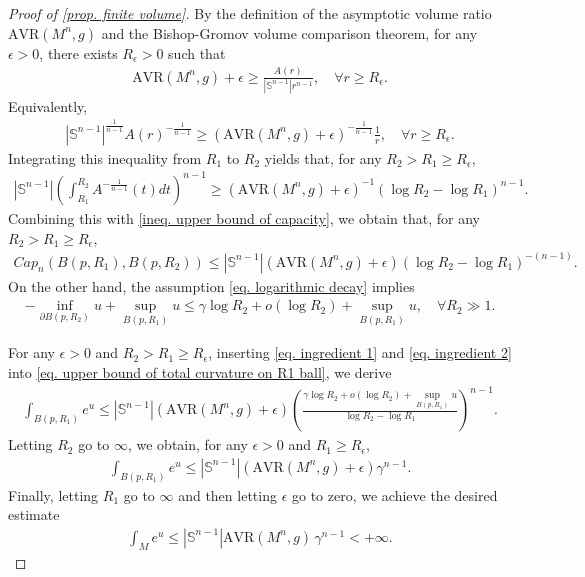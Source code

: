 \documentclass[12pt]{amsart}
\theoremstyle{plain}
\theoremstyle{definition}
\theoremstyle{remark}     %
\begin{document}
\begin{proof}[Proof of \cref{prop. finite volume}]
    By the definition of the asymptotic volume ratio $\mathrm{AVR}(M^n,g)$ and the Bishop-Gromov volume comparison theorem, for any $\epsilon>0$, there exists $R_\epsilon>0$ such that
    \begin{align*}
        \mathrm{AVR}(M^n,g)+\epsilon\geq \frac{A(r)}{|\mathbb{S}^{n-1}|r^{n-1}},\quad \forall r\geq R_\epsilon.
    \end{align*}
    Equivalently,
    \begin{align*}
        |\mathbb{S}^{n-1}|^{\frac{1}{n-1}} 
        A(r)^{-\frac{1}{n-1}}
        \geq (\mathrm{AVR}(M^n,g)+\epsilon)^{-\frac{1}{n-1}}\frac{1}{r},\quad \forall r\geq R_\epsilon.
    \end{align*}
    Integrating this inequality from $R_1$ to $R_2$ yields that, for any $R_2>R_1\geq R_\epsilon$,
    \begin{align*}
        |\mathbb{S}^{n-1}|
        \left(\int_{R_1}^{R_2} A^{-\frac{1}{n-1}}(t)d t\right)^{n-1}
        \geq (\mathrm{AVR}(M^n,g)+\epsilon)^{-1}
        (\log R_2-\log R_1)^{n-1}.
    \end{align*}
    Combining this with \cref{ineq. upper bound of capacity}, we obtain that, for any $R_2>R_1\geq R_\epsilon$,
    \begin{align}\label{eq. ingredient 1}
        Cap_n(B(p,R_1), B(p,R_2))
        \leq 
        |\mathbb{S}^{n-1}|(\mathrm{AVR}(M^n,g)+\epsilon)
        \left(\log R_2-\log R_1\right)^{-(n-1)}.
    \end{align}
    On the other hand, the assumption \cref{eq. logarithmic decay} implies
    \begin{align}\label{eq. ingredient 2}
        -\inf_{\partial B(p,R_2)} u
        +\sup_{ B(p,R_1)}u
        \leq \gamma\log R_2+o(\log R_2)
        +\sup_{ B(p,R_1)}u,\quad 
        \forall R_2\gg 1.
    \end{align}
    
    For any $\epsilon>0$ and $R_2> R_1\geq R_\epsilon$,  inserting \cref{eq. ingredient 1} and \cref{eq. ingredient 2} into \cref{eq. upper bound of total curvature on R1 ball}, we derive
    \begin{align*}
        \int_{B(p,R_1)}e^u
        \leq |\mathbb{S}^{n-1}|
        (\mathrm{AVR}(M^n,g)+\epsilon)
        \left(\frac{\gamma\log R_2+o(\log R_2)+\sup_{B(p,R_1)}u}{\log R_2-\log R_1}\right)^{n-1}.
    \end{align*}
    Letting $R_2$ go to $\infty$, we obtain, for any $\epsilon>0$ and $R_1\geq R_\epsilon$,
    \begin{align*}
    \int_{B(p,R_1)}e^u
    \leq |\mathbb{S}^{n-1}|(\mathrm{AVR}(M^n,g)+\epsilon)
    \gamma^{n-1}.
    \end{align*}
    Finally, letting $R_1$ go to $\infty$ and then letting $\epsilon$ go to zero, we achieve the desired estimate
    \begin{align*}
        \int_M e^u\leq |\mathbb{S}^{n-1}|
        \mathrm{AVR}(M^n,g)\,\gamma^{n-1}<+\infty.
    \end{align*}
\end{proof}
\end{document}

